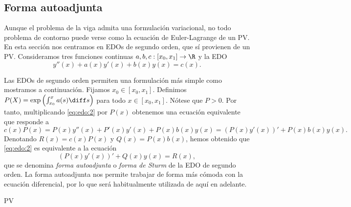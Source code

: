 \documentclass{article}
\begin{document}
\begin{ex}
  
\end{ex}

\begin{ex}
  
\end{ex}

\subsection{Forma autoadjunta}

Aunque el problema de la viga admita una formulación variacional, no todo problema de contorno puede
verse como la ecuación de Euler-Lagrange de un PV. En esta sección nos centramos en EDOs de segundo
orden, que sí provienen de un PV. Consideramos tres funciones continuas
$a, b, c : [x_0, x_1] \to \R$ y la EDO
\begin{equation} \label{eq:edo:2} y''(x) + a(x) y'(x) + b(x)y(x) = c(x).
\end{equation}

Las EDOs de segundo orden permiten una formulación más simple como mostramos a continuación. Fijamos
$x_0 \in [x_0, x_1]$. Definimos $P(X) = \exp\left(\int^x_{x_0} a(s) \diff s\right)$ para todo
$x \in [x_0, x_1]$. Nótese que $P > 0$. Por tanto, multiplicando \eqref{eq:edo:2} por $P(x)$
obtenemos una ecuación equivalente que responde a
\[c(x) P(x) = P(x)y''(x) + P'(x)y'(x) + P(x) b(x) y(x) = \left(P(x)y'(x)\right)' + P(x) b(x) y(x).\]
Denotando $R(x) = c(x) P(x)$ y $Q(x) = P(x) b(x)$, hemos obtenido que \eqref{eq:edo:2} es equivalente a la ecuación
\begin{equation}
  \label{eq:edo:2}
  \left(P(x)y'(x)\right)' + Q(x) y(x) = R(x),
\end{equation}
que se denomina \emph{forma autoadjunta} o \emph{forma de Sturm} de la EDO de segundo orden. La forma autoadjunta nos permite trabajar de forma más cómoda con la ecuación diferencial, por lo que será habitualmente utilizada de aquí en adelante.

\begin{prop}
  PV
\end{prop}
\end{document}
